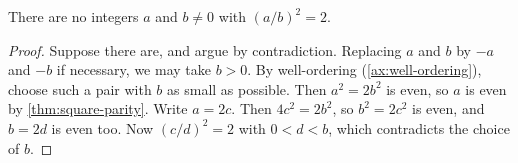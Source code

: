\begin{theorem}\label{thm:sqrt2-irrational}
  There are no integers $a$ and $b \neq 0$ with $(a/b)^2 = 2$.
\end{theorem}

\begin{proof}
  Suppose there are, and argue by contradiction. Replacing $a$ and $b$ by
  $-a$ and $-b$ if necessary, we may take $b > 0$. By well-ordering
  (\cref{ax:well-ordering}), choose such a pair with $b$ as small as
  possible. Then $a^2 = 2b^2$ is even, so $a$ is even by
  \cref{thm:square-parity}. Write $a = 2c$. Then $4c^2 = 2b^2$, so
  $b^2 = 2c^2$ is even, and $b = 2d$ is even too. Now $(c/d)^2 = 2$ with
  $0 < d < b$, which contradicts the choice of $b$.
\end{proof}
